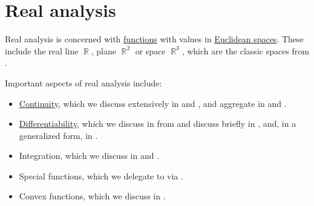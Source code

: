 \section{Real analysis}\label{sec:real_analysis}

Real analysis is concerned with \hyperref[def:function]{functions} with values in \hyperref[def:euclidean_space]{Euclidean spaces}. These include the real line \( \BbbR \), plane \( \BbbR^2 \) or space \( \BbbR^3 \), which are the classic spaces from .

Important aspects of real analysis include:
\begin{itemize}
  \item \hyperref[def:local_continuity]{Continuity}, which we discuss extensively in  and , and aggregate in  and .

  \item \hyperref[def:differentiability]{Differentiability}, which we discuss in  from  and discuss briefly in , and, in a generalized form, in .

  \item Integration, which we discuss in  and .

  \item Special functions, which we delegate to  via .

  \item Convex functions, which we discuss in .
\end{itemize}
